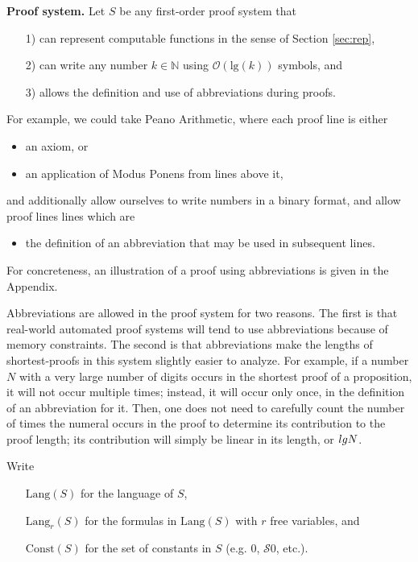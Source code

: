 \documentclass[jsl,reqno,bibay2]{asl}
\renewcommand{\paragraph}{\textbf}
\numberwithin{equation}{section}
\theoremstyle{definition}
\newcommand{\NN}{\mathbb{N}}
\newcommand{\Oo}{\mathcal{O}}
\newcommand{\Ss}{\mathcal{S}}
\newcommand{\Lang}{\mathrm{Lang}}
\newcommand{\Const}{\mathrm{Const}}
\renewcommand{\lg}[1]{\mathrm{lg}(#1)}
\renewcommand{\-}{^{-1}}
\begin{document}
\paragraph{Proof system.}
\label{sec:system}
Let $S$ be any first-order proof system that
\begin{itemize}
\item[1)] can represent computable functions in the sense of Section \ref{sec:rep},
\item[2)] can write any number $k\in\NN$ using $\Oo(\lg{k})$ symbols, and 
\item[3)] allows the definition and use of abbreviations during proofs.
\end{itemize}
For example, we could take Peano Arithmetic, where each proof line is either 
\begin{itemize}
\item an axiom, or
\item an application of Modus Ponens from lines above it,
\end{itemize}
and additionally allow ourselves to write numbers in a binary format, and allow proof lines lines which are
\begin{itemize}
\item the definition of an abbreviation that may be used in subsequent lines.
\end{itemize}
For concreteness, an illustration of a proof using abbreviations is given in the Appendix.

Abbreviations are allowed in the proof system for two reasons.  The first is that real-world automated proof systems will tend to use abbreviations because of memory constraints.  The second is that abbreviations make the lengths of shortest-proofs in this system slightly easier to analyze.  For example, if a number $N$ with a very large number of digits occurs in the shortest proof of a proposition, it will not occur multiple times; instead, it will occur only once, in the definition of an abbreviation for it.  Then, one does not need to carefully count the number of times the numeral occurs in the proof to determine its contribution to the proof length; its contribution will simply be linear in its length, or $\\lg{N}$.

Write 
\begin{itemize}
\item[] $\Lang(S)$ for the language of $S$,
\item[] $\Lang_r(S)$ for the formulas in $\Lang(S)$ with $r$ free variables, and 
\item[] $\Const(S)$ for the set of constants in $S$ (e.g. $0$, $\Ss 0$, etc.).
\end{itemize}
\end{document}
